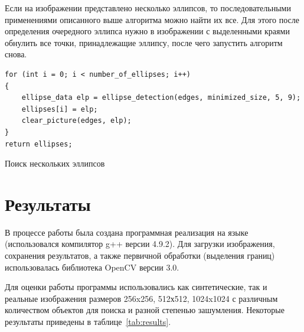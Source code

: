 Если на изображении представлено несколько эллипсов, то последовательными применениями описанного выше алгоритма можно найти их все. 
Для этого после определения очередного эллипса нужно в изображении с выделенными краями обнулить все точки, принадлежащие эллипсу, после чего запустить алгоритм снова.

\begin{ListingEnv}[H]
\begin{lstlisting}
for (int i = 0; i < number_of_ellipses; i++)
{
    ellipse_data elp = ellipse_detection(edges, minimized_size, 5, 9);
    ellipses[i] = elp;
    clear_picture(edges, elp);
}
return ellipses;
\end{lstlisting}
\caption{Поиск нескольких эллипсов}
\label{list:several_ellipses}
\end{ListingEnv}

\section{Результаты}
В процессе работы была создана программная реализация на языке \protect\cpp (использовался компилятор g++ версии 4.9.2). 
Для загрузки изображения, сохранения результатов, а также первичной обработки (выделения границ) использовалась библиотека OpenCV версии 3.0.

Для оценки работы программы использовались как синтетические, так и реальные изображения размеров 256x256, 512х512, 1024x1024 с различным количеством объектов для поиска и разной степенью зашумления.
Некоторые результаты приведены в таблице~\ref{tab:results}.

